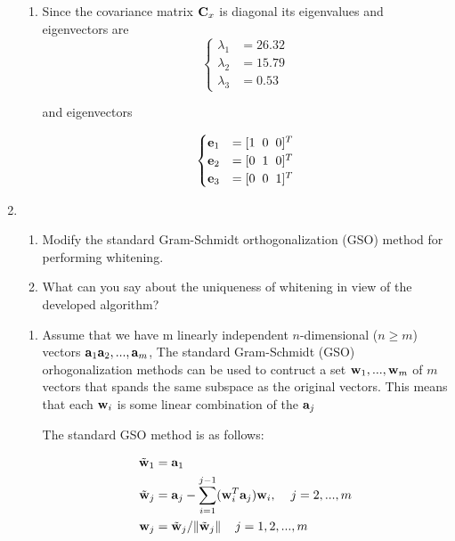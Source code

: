 \begin{enumerate}
\begin{solution}
\begin{enumerate}
    \item Since the covariance matrix $\mathbf{C}_x$ is diagonal its
      eigenvalues and eigenvectors are
      \[
      \begin{cases}
        \lambda_1 &= 26.32 \\
        \lambda_2 &= 15.79 \\
        \lambda_3 &= 0.53
      \end{cases}
      \]

      and eigenvectors

      \[
      \begin{cases}
        \mathbf{e}_1 &= [1 \hspace{2mm} 0 \hspace{2mm} 0]^T \\
        \mathbf{e}_2 &= [0 \hspace{2mm} 1 \hspace{2mm} 0]^T \\
        \mathbf{e}_3 &= [0 \hspace{2mm} 0 \hspace{2mm} 1]^T
      \end{cases}
      \]
    \end{enumerate}
  \end{solution}

\item
  \begin{enumerate}
  \item Modify the standard Gram-Schmidt orthogonalization (GSO)
    method for performing whitening.
  \item What can you say about the uniqueness of whitening in view of
    the developed algorithm?
  \end{enumerate}
  
  \begin{solution}

    \begin{enumerate}
    \item Assume that we have m linearly independent $n$-dimensional
      ($n\geq m$) vectors $\mathbf{a}_1 \mathbf{a}_2, ..., \mathbf{a}_m$,
      The standard Gram-Schmidt (GSO) orhogonalization methods can be
      used to contruct a set $\mathbf{w}_1, ..., \mathbf{w}_m$ of $m$
      vectors that spands the same subspace as the original
      vectors. This means that each $\mathbf{w}_i$ is some linear
      combination of the $\mathbf{a}_j$

      The standard GSO method is as follows:

      \[
      \begin{split}
        \tilde{\mathbf{w}}_1 &= \mathbf{a}_1 \\
        \tilde{\mathbf{w}}_j &= \mathbf{a}_j - \sum_{i=1}^{j-1}
        (\mathbf{w}_i^T
        \mathbf{a}_j)\mathbf{w}_i, \hspace{4mm} j=2,...,m \\
        \mathbf{w}_j &= \tilde{\mathbf{w}}_j / \| \tilde{\mathbf{w}}_j \|
        \hspace{4mm} j=1,2,...,m
      \end{split}
      \]


\end{enumerate}
\end{solution}
\end{enumerate}
